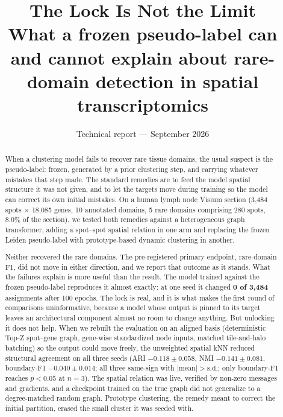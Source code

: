 \documentclass[twocolumn,10pt]{article}
\begin{document}
\title{\vspace{-2.2em}\bfseries The Lock Is Not the Limit\\[0.3em]
\large What a frozen pseudo-label can and cannot explain about rare-domain detection in spatial transcriptomics}
\author{}
\date{Technical report --- September 2026}
\maketitle

\vspace{-2.5em}

\begin{abstract}
\noindent When a clustering model fails to recover rare tissue domains, the usual suspect is the pseudo-label: frozen, generated by a prior clustering step, and carrying whatever mistakes that step made. The standard remedies are to feed the model spatial structure it was not given, and to let the targets move during training so the model can correct its own initial mistakes. On a human lymph node Visium section (3{,}484 spots $\times$ 18{,}085 genes, 10 annotated domains, 5 rare domains comprising 280 spots, 8.0\% of the section), we tested both remedies against a heterogeneous graph transformer, adding a spot--spot spatial relation in one arm and replacing the frozen Leiden pseudo-label with prototype-based dynamic clustering in another.

Neither recovered the rare domains. The pre-registered primary endpoint, rare-domain F1, did not move in either direction, and we report that outcome as it stands. What the failures explain is more useful than the result. The model trained against the frozen pseudo-label reproduces it almost exactly: at one seed it changed \textbf{0 of 3{,}484} assignments after 100 epochs. The lock is real, and it is what makes the first round of comparisons uninformative, because a model whose output is pinned to its target leaves an architectural component almost no room to change anything. But unlocking it does not help. When we rebuilt the evaluation on an aligned basis (deterministic Top-Z spot--gene graph, gene-wise standardized node inputs, matched tile-and-halo batching) so the output could move freely, the unweighted spatial kNN reduced structural agreement on all three seeds (ARI $-0.118 \pm 0.058$, NMI $-0.141 \pm 0.081$, boundary-F1 $-0.040 \pm 0.014$; all three same-sign with $|\text{mean}| > \text{s.d.}$; only boundary-F1 reaches $p < 0.05$ at $n = 3$). The spatial relation was live, verified by non-zero messages and gradients, and a checkpoint trained on the true graph did not generalize to a degree-matched random graph. Prototype clustering, the remedy meant to correct the initial partition, erased the small cluster it was seeded with.


\end{abstract}
\end{document}
